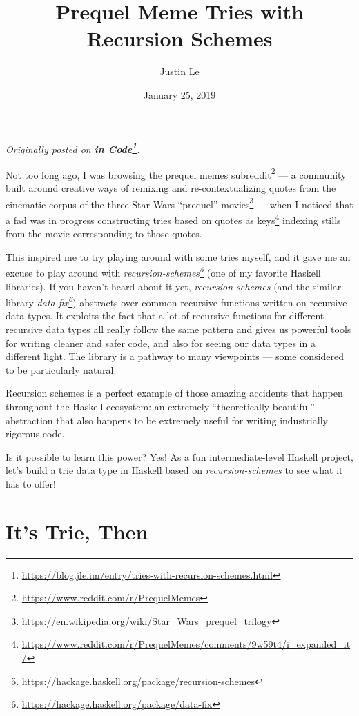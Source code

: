 \documentclass[]{article}
\title{Prequel Meme Tries with Recursion Schemes}
\author{Justin Le}
\date{January 25, 2019}
\renewcommand{\href}[2]{#2\footnote{\url{#1}}}
\begin{document}
\maketitle

\emph{Originally posted on
\textbf{\href{https://blog.jle.im/entry/tries-with-recursion-schemes.html}{in
Code}}.}

Not too long ago, I was browsing the
\href{https://www.reddit.com/r/PrequelMemes}{prequel memes subreddit} --- a
community built around creative ways of remixing and re-contextualizing quotes
from the cinematic corpus of the three
\href{https://en.wikipedia.org/wiki/Star_Wars_prequel_trilogy}{Star Wars
``prequel'' movies} --- when I noticed that a fad was in progress
\href{https://www.reddit.com/r/PrequelMemes/comments/9w59t4/i_expanded_it/}{constructing
tries based on quotes as keys} indexing stills from the movie corresponding to
those quotes.

This inspired me to try playing around with some tries myself, and it gave me an
excuse to play around with
\emph{\href{https://hackage.haskell.org/package/recursion-schemes}{recursion-schemes}}
(one of my favorite Haskell libraries). If you haven't heard about it yet,
\emph{recursion-schemes} (and the similar library
\emph{\href{https://hackage.haskell.org/package/data-fix}{data-fix}}) abstracts
over common recursive functions written on recursive data types. It exploits the
fact that a lot of recursive functions for different recursive data types all
really follow the same pattern and gives us powerful tools for writing cleaner
and safer code, and also for seeing our data types in a different light. The
library is a pathway to many viewpoints --- some considered to be particularly
natural.

Recursion schemes is a perfect example of those amazing accidents that happen
throughout the Haskell ecosystem: an extremely ``theoretically beautiful''
abstraction that also happens to be extremely useful for writing industrially
rigorous code.

Is it possible to learn this power? Yes! As a fun intermediate-level Haskell
project, let's build a trie data type in Haskell based on
\emph{recursion-schemes} to see what it has to offer!

\hypertarget{its-trie-then}{%
\section{It's Trie, Then}\label{its-trie-then}}
\end{document}
